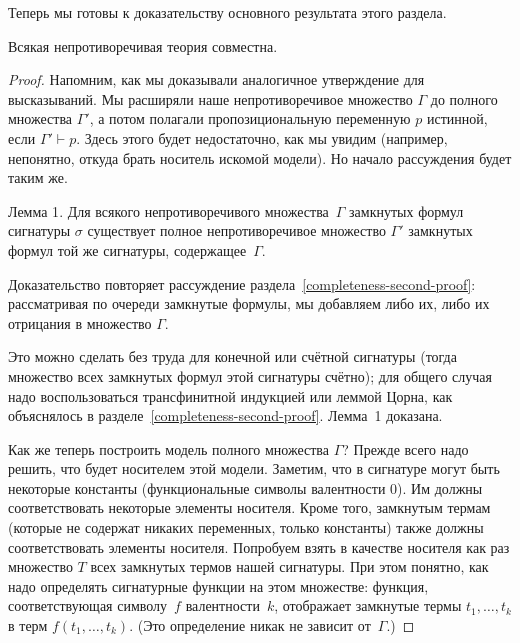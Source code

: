 Теперь мы готовы к доказательству
основного результата этого раздела.

\begin{theorem}
%
        \label{strong-completeness}%
Всякая непротиворечивая теория совместна.
\end{theorem}

\begin{proof}
Напомним, как мы доказывали аналогичное утверждение для
высказываний. Мы расширяли наше непротиворечивое%
%
множество $\Gamma$ до полного%
%
множества $\Gamma'$, а потом полагали
пропозициональную переменную $p$ истинной, если $\Gamma'\vdash
p$. Здесь этого будет недостаточно, как мы увидим (например,
непонятно, откуда брать носитель искомой модели). Но начало
рассуждения будет таким же.

\textsf{Лемма 1}. Для всякого непротиворечивого
множества~$\Gamma$ замкнутых формул сигнатуры $\sigma$ существует полное
непротиворечивое множество $\Gamma'$ замкнутых формул той же
сигнатуры, содержащее~$\Gamma$.

Доказательство повторяет рассуждение
раздела~\ref{completeness-second-proof}: рассматривая по очереди
замкнутые формулы, мы добавляем либо их, либо их
отрицания в множество $\Gamma$.

Это можно сделать без труда для конечной или счётной сигнатуры
(тогда множество всех замкнутых формул этой сигнатуры счётно);
для общего случая надо воспользоваться трансфинитной индукцией
или леммой Цорна, как объяснялось в
разделе~\ref{completeness-second-proof}.
Лемма~1 доказана.

Как же теперь построить модель полного множества $\Gamma$?
Прежде всего надо решить, что будет носителем этой модели.
Заметим, что в сигнатуре могут быть некоторые константы
(функциональные символы валентности $0$). Им должны
соответствовать некоторые элементы носителя. Кроме того,
замкнутым термам (которые не содержат никаких переменных, только
константы) также должны соответствовать элементы носителя.
Попробуем взять в качестве носителя как раз множество $T$ всех
замкнутых термов нашей сигнатуры. При этом понятно, как надо
определять сигнатурные функции на этом множестве: функция,
соответствующая символу~$f$ валентности~$k$, отображает
замкнутые термы $t_1,\ldots,t_k$ в терм $f(t_1,\dots,t_k)$. (Это
определение никак не зависит от~$\Gamma$.)


\end{proof}
